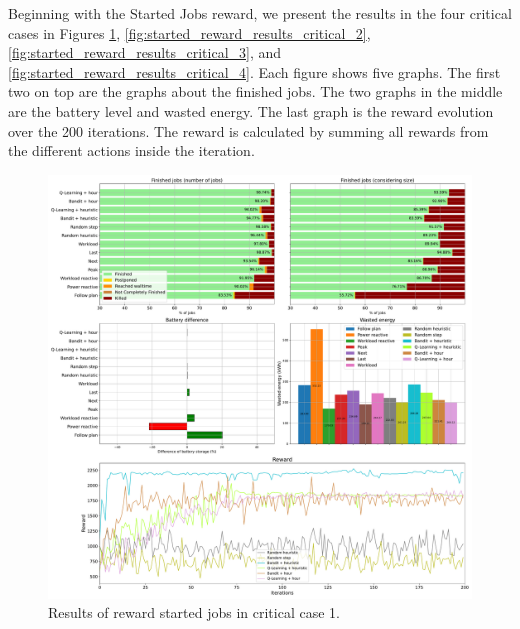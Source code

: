 Beginning with the Started Jobs reward, we present the results in the four critical cases in Figures \ref{fig:started_reward_results_critical_1}, \ref{fig:started_reward_results_critical_2}, \ref{fig:started_reward_results_critical_3}, and \ref{fig:started_reward_results_critical_4}. Each figure shows five graphs. The first two on top are the graphs about the finished jobs. The two graphs in the middle are the battery level and wasted energy. The last graph is the reward evolution over the 200 iterations. The reward is calculated by summing all rewards from the different actions inside the iteration.

\begin{figure}[!htb]
    \centering
    \includegraphics[scale=0.29]{Images/Learning_compensations/reward_started_profile_best_workload_1_with_noise_state_delta.pdf}
    \caption{Results of reward started jobs in critical case 1.}
    \label{fig:started_reward_results_critical_1}
\end{figure}


